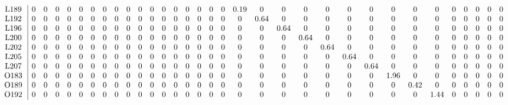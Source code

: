 \begin{table}[H]
\begin{center}
\begin{math}
\begin{array}{c|cccccccccccccccccccccccccccccccc}
\mathrm{L189} \hspace*{2pt} &  0 &  0 &  0 &  0 &  0 &  0 &  0 &  0 &  0 &  0 &  0 &  0 &  0 &  0 &  0 &  0 &  0 &       0.19 &  0 &  0 &  0 &  0 &  0 &  0 &  0 &  0 &  0 &  0 &  0 &  0 &  0 &  0 \\
\mathrm{L192} \hspace*{2pt} &  0 &  0 &  0 &  0 &  0 &  0 &  0 &  0 &  0 &  0 &  0 &  0 &  0 &  0 &  0 &  0 &  0 &  0 &       0.64 &  0 &  0 &  0 &  0 &  0 &  0 &  0 &  0 &  0 &  0 &  0 &  0 &  0 \\
\mathrm{L196} \hspace*{2pt} &  0 &  0 &  0 &  0 &  0 &  0 &  0 &  0 &  0 &  0 &  0 &  0 &  0 &  0 &  0 &  0 &  0 &  0 &  0 &       0.64 &  0 &  0 &  0 &  0 &  0 &  0 &  0 &  0 &  0 &  0 &  0 &  0 \\
\mathrm{L200} \hspace*{2pt} &  0 &  0 &  0 &  0 &  0 &  0 &  0 &  0 &  0 &  0 &  0 &  0 &  0 &  0 &  0 &  0 &  0 &  0 &  0 &  0 &       0.64 &  0 &  0 &  0 &  0 &  0 &  0 &  0 &  0 &  0 &  0 &  0 \\
\mathrm{L202} \hspace*{2pt} &  0 &  0 &  0 &  0 &  0 &  0 &  0 &  0 &  0 &  0 &  0 &  0 &  0 &  0 &  0 &  0 &  0 &  0 &  0 &  0 &  0 &       0.64 &  0 &  0 &  0 &  0 &  0 &  0 &  0 &  0 &  0 &  0 \\
\mathrm{L205} \hspace*{2pt} &  0 &  0 &  0 &  0 &  0 &  0 &  0 &  0 &  0 &  0 &  0 &  0 &  0 &  0 &  0 &  0 &  0 &  0 &  0 &  0 &  0 &  0 &       0.64 &  0 &  0 &  0 &  0 &  0 &  0 &  0 &  0 &  0 \\
\mathrm{L207} \hspace*{2pt} &  0 &  0 &  0 &  0 &  0 &  0 &  0 &  0 &  0 &  0 &  0 &  0 &  0 &  0 &  0 &  0 &  0 &  0 &  0 &  0 &  0 &  0 &  0 &       0.64 &  0 &  0 &  0 &  0 &  0 &  0 &  0 &  0 \\
\mathrm{O183} \hspace*{2pt} &  0 &  0 &  0 &  0 &  0 &  0 &  0 &  0 &  0 &  0 &  0 &  0 &  0 &  0 &  0 &  0 &  0 &  0 &  0 &  0 &  0 &  0 &  0 &  0 &       1.96 &  0 &  0 &  0 &  0 &  0 &  0 &  0 \\
\mathrm{O189} \hspace*{2pt} &  0 &  0 &  0 &  0 &  0 &  0 &  0 &  0 &  0 &  0 &  0 &  0 &  0 &  0 &  0 &  0 &  0 &  0 &  0 &  0 &  0 &  0 &  0 &  0 &  0 &       0.42 &  0 &  0 &  0 &  0 &  0 &  0 \\
\mathrm{O192} \hspace*{2pt} &  0 &  0 &  0 &  0 &  0 &  0 &  0 &  0 &  0 &  0 &  0 &  0 &  0 &  0 &  0 &  0 &  0 &  0 &  0 &  0 &  0 &  0 &  0 &  0 &  0 &  0 &       1.44 &  0 &  0 &  0 &  0 &  0 \\

\end{array}
\end{math}
\end{center}
\end{table}
